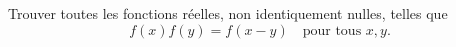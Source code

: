 Trouver toutes les fonctions réelles, non identiquement nulles, telles que
\[ f(x)f(y) = f(x - y) \quad\text{pour tous } x, y. \]
